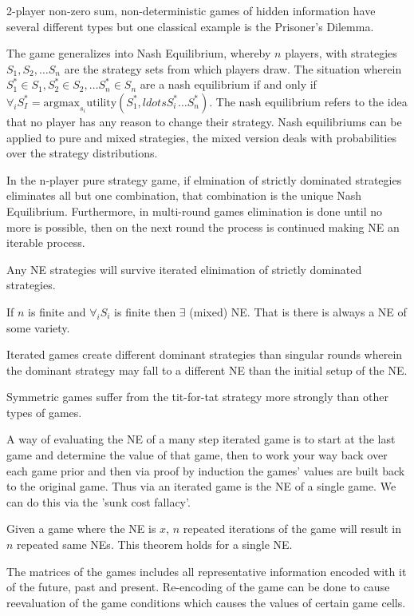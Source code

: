 \documentclass{article}
\begin{document}
2-player non-zero sum, non-deterministic games of hidden information have
several different types but one classical example is the Prisoner's Dilemma. 

The game generalizes into Nash Equilibrium, whereby $n$ players, with strategies
$S_1, S_2, \ldots S_n$ are the strategy sets from which players draw. The
situation wherein $S_1^* \in S_1, S_2^* \in S_2, \ldots S_n^* \in S_n$ are a
nash equilibrium if and only if $\forall_i S_I^* = \text{argmax}_{s_i} 
\text{utility}(S_1^*,ldots S_i^* \ldots S_n^*)$. The nash equilibrium refers to 
the idea that no player has any reason to change their strategy. Nash
equilibriums can be applied to pure and mixed strategies, the mixed version 
deals with probabilities over the strategy distributions. 

In the n-player pure strategy game, if elmination of strictly dominated 
strategies eliminates all but one combination, that combination is the 
unique Nash Equilibrium. Furthermore, in multi-round games elimination is 
done until no more is possible, then on the next round the process is continued
making NE an iterable process. 

Any NE strategies will survive iterated elinimation of strictly dominated 
strategies.

If $n$ is finite and $\forall_i S_i$ is finite then $\exists$ (mixed) NE. That
is there is always a NE of some variety. 

Iterated games create different dominant strategies than singular rounds 
wherein the dominant strategy may fall to a different NE than the initial 
setup of the NE. 

Symmetric games suffer from the tit-for-tat strategy more strongly than other
types of games.  

A way of evaluating the NE of a many step iterated game is to start 
at the last game and determine the value of that game, then to work your way
back over each game prior and then via proof by induction the games' values
are built back to the original game. Thus via an iterated game is the NE of a 
single game. We can do this via the 'sunk cost fallacy'. 

Given a game where the NE is $x$, $n$ repeated iterations of the game will 
result in $n$ repeated same NEs. This theorem holds for a single NE. 

The matrices of the games includes all representative information encoded with
it of the future, past and present. Re-encoding of the game can be done to 
cause reevaluation of the game conditions which causes the values of certain
game cells. 
\end{document}
